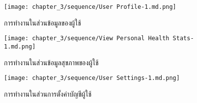 \begin{figure}
    \texttt{[image: chapter\_3/sequence/User Profile-1.md.png]}
    \caption{การทำงานในส่วนข้อมูลของผู้ใช้}
\end{figure}

\begin{figure}
    \texttt{[image: chapter\_3/sequence/View Personal Health Stats-1.md.png]}
    \caption{การทำงานในส่วนข้อมูลสุขภาพของผู้ใช้}
\end{figure}

\begin{figure}
    \texttt{[image: chapter\_3/sequence/User Settings-1.md.png]}
    \caption{การทำงานในส่วนการตั้งค่าบัญชีผู้ใช้}
\end{figure}

\clearpage